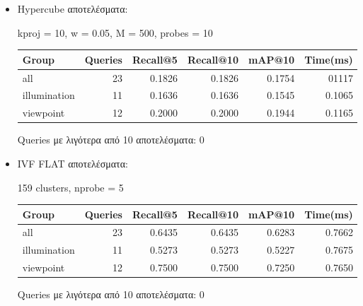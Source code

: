\documentclass [conference]{IEEEtran}
\begin{document}
\begin{itemize}
    \item Hypercube αποτελέσματα:
    \begin{table}[H]
    \centering
    \small
    \setlength{\tabcolsep}{3pt}
    kproj = 10, w = 0.05, M = 500, probes = 10
    \par\smallskip
    \begin{tabular}{l r r r r r}
    \hline
    \textbf{Group} & \textbf{Queries} & \textbf{Recall@5} & \textbf{Recall@10} & \textbf{mAP@10} & \textbf{Time(ms)} \\
    \hline
    all & 23 & 0.1826 & 0.1826 & 0.1754 & 01117 \\
    illumination & 11 & 0.1636 & 0.1636 & 0.1545 & 0.1065 \\
    viewpoint & 12 & 0.2000 & 0.2000 & 0.1944 & 0.1165 \\
    \hline
    \end{tabular}
    \par\smallskip
    \footnotesize Queries με λιγότερα από 10 αποτελέσματα: 0
    \end{table}


    \item IVF FLAT αποτελέσματα:
    \begin{table}[H]
    \centering
    \small
    \setlength{\tabcolsep}{3pt}
    159 clusters, nprobe = 5
    \par\smallskip
    \begin{tabular}{l r r r r r}
    \hline
    \textbf{Group} & \textbf{Queries} & \textbf{Recall@5} & \textbf{Recall@10} & \textbf{mAP@10} & \textbf{Time(ms)} \\
    \hline
    all & 23 & 0.6435 & 0.6435 & 0.6283 & 0.7662 \\
    illumination & 11 & 0.5273 & 0.5273 & 0.5227 & 0.7675 \\
    viewpoint & 12 & 0.7500 & 0.7500 & 0.7250 & 0.7650 \\
    \hline
    \end{tabular}
    \par\smallskip
    \footnotesize Queries με λιγότερα από 10 αποτελέσματα: 0
    \end{table}

        

\end{itemize}
\end{document}
